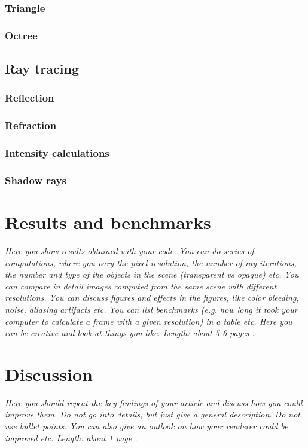 \documentclass[]{report}   %
\begin{document}
\subsection{Triangle}
\subsection{Octree}

\section{Ray tracing}
\subsection{Reflection}
\subsection{Refraction}
\subsection{Intensity calculations}
\subsection{Shadow rays}

\chapter{Results and benchmarks}
\emph{Here you show results obtained with your code. You can do series of computations, where you vary the pixel resolution, the number of ray iterations, the number and type of the objects in the scene (transparent vs opaque) etc. You can compare in detail images computed from the same scene with different resolutions. You can discuss figures and effects in the figures, like color bleeding, noise, aliasing artifacts etc. You can list benchmarks (e.g. how long it took your computer to calculate a frame with a given resolution) in a table etc. Here you can be creative and look at things you like. 
Length: about 5-6 pages .}


\chapter{Discussion}
\emph{Here you should repeat the key findings of your article and discuss how you could improve them. 
Do not go into details, but just give a general description. 
Do not use bullet points. 
You can also give an outlook on how your renderer could be improved etc. 
Length: about 1 page .}



\end{document}
